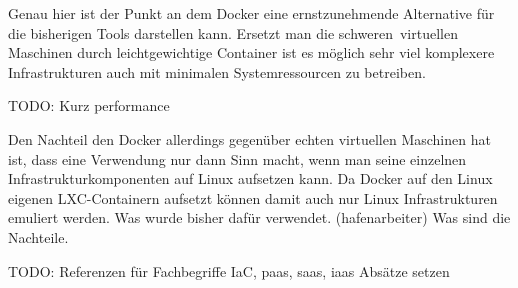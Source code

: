 Genau hier ist der Punkt an dem Docker eine ernstzunehmende Alternative für die bisherigen Tools darstellen kann. Ersetzt man die \grq schweren\grq\ virtuellen Maschinen durch leichtgewichtige Container ist es möglich sehr viel komplexere Infrastrukturen auch mit minimalen Systemressourcen zu betreiben.

TODO: Kurz performance



Den Nachteil den Docker allerdings gegenüber echten virtuellen Maschinen hat ist, dass eine Verwendung nur dann Sinn macht, wenn man seine einzelnen Infrastrukturkomponenten auf Linux aufsetzen kann. Da Docker auf den Linux eigenen LXC-Containern aufsetzt können damit auch nur Linux Infrastrukturen emuliert werden.
Was wurde bisher dafür verwendet. (hafenarbeiter) Was sind die Nachteile. 

TODO: Referenzen für Fachbegriffe IaC, paas, saas, iaas
Absätze setzen